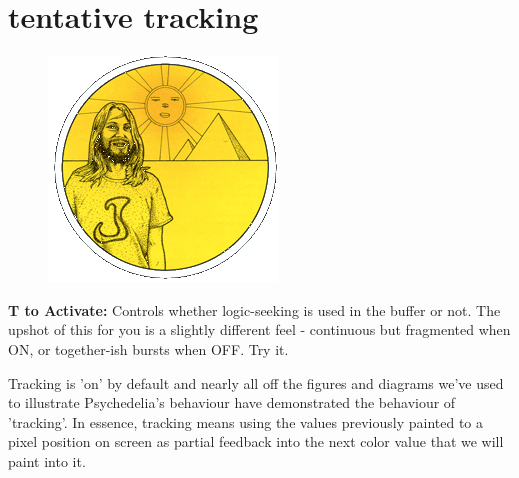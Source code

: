 \section*{tentative tracking} 
\label{sec:tracking}
\lstset{style=6502Style}
\lstset{ 
   aboveskip=5pt,
   belowskip=0pt,
}

\begin{definition}
\setlength{\intextsep}{0pt}%
\setlength{\columnsep}{3pt}%
\begin{figure}
\includegraphics[width=\linewidth]{src/callout/psych.png} 
\end{figure}
\small
\textbf{T to Activate:} Controls whether logic-seeking is used in
the buffer or not. The upshot of this for you is a slightly different
feel - continuous but fragmented when ON, or together-ish bursts
when OFF. Try it.
\\
\end{definition}

Tracking is 'on' by default and nearly all off the figures and diagrams we've used to illustrate
Psychedelia's behaviour have demonstrated the behaviour of 'tracking'. In essence, tracking means
using the values previously painted to a pixel position on screen as partial feedback into the next
color value that we will paint into it. 


